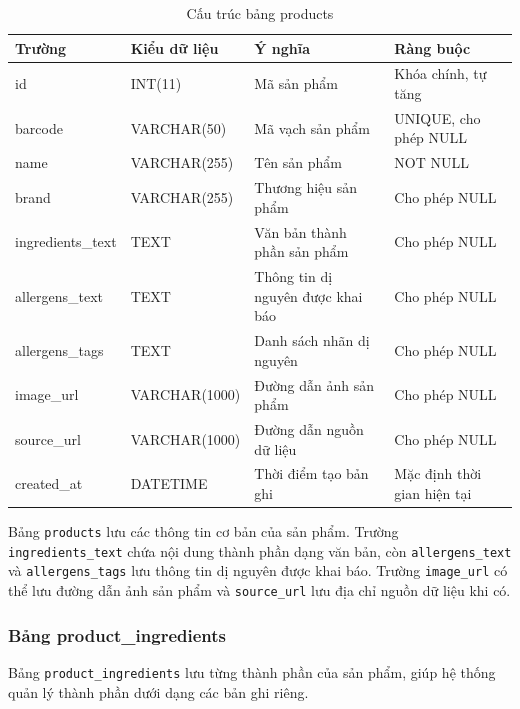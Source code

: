 \begin{table}[H]
	\centering
	\caption{Cấu trúc bảng products}
	\label{tab:products}
	\small
	\begin{tabularx}{\textwidth}{|l|l|X|l|}
		\hline
		\textbf{Trường} & \textbf{Kiểu dữ liệu} & \textbf{Ý nghĩa} & \textbf{Ràng buộc} \\
		\hline
		id & INT(11) & Mã sản phẩm & Khóa chính, tự tăng \\
		\hline
		barcode & VARCHAR(50) & Mã vạch sản phẩm & UNIQUE, cho phép NULL \\
		\hline
		name & VARCHAR(255) & Tên sản phẩm & NOT NULL \\
		\hline
		brand & VARCHAR(255) & Thương hiệu sản phẩm & Cho phép NULL \\
		\hline
		ingredients\_text & TEXT & Văn bản thành phần sản phẩm & Cho phép NULL \\
		\hline
		allergens\_text & TEXT & Thông tin dị nguyên được khai báo & Cho phép NULL \\
		\hline
		allergens\_tags & TEXT & Danh sách nhãn dị nguyên & Cho phép NULL \\
		\hline
		image\_url & VARCHAR(1000) & Đường dẫn ảnh sản phẩm & Cho phép NULL \\
		\hline
		source\_url & VARCHAR(1000) & Đường dẫn nguồn dữ liệu & Cho phép NULL \\
		\hline
		created\_at & DATETIME & Thời điểm tạo bản ghi & Mặc định thời gian hiện tại \\
		\hline
	\end{tabularx}
\end{table}

Bảng \texttt{products} lưu các thông tin cơ bản của sản phẩm. Trường \texttt{ingredients\_\allowbreak text} chứa nội dung thành phần dạng văn bản, còn \texttt{allergens\_\allowbreak text} và \texttt{allergens\_\allowbreak tags} lưu thông tin dị nguyên được khai báo. Trường \texttt{image\_\allowbreak url} có thể lưu đường dẫn ảnh sản phẩm và \texttt{source\_\allowbreak url} lưu địa chỉ nguồn dữ liệu khi có.

\subsubsection{Bảng product\_ingredients}

Bảng \texttt{product\_ingredients} lưu từng thành phần của sản phẩm, giúp hệ thống quản lý thành phần dưới dạng các bản ghi riêng.

